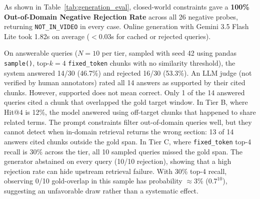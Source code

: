 \documentclass[conference]{IEEEtran}
\begin{document}
\begin{table}[htbp]
\caption{End-to-End Generation Evaluation Across Pedagogical Tiers ($N_{\text{pos}}=30, N_{\text{neg}}=26$, Evaluated under \texttt{fixed\_token}, Top-$k=4$)}
\label{tab:generation_eval}
\centering
{}
\end{table}

As shown in Table~\ref{tab:generation_eval}, closed-world constraints gave a \textbf{100\% Out-of-Domain Negative Rejection Rate} across all 26 negative probes, returning \texttt{NOT\_IN\_VIDEO} in every case. Online generation with Gemini 3.5 Flash Lite took 1.82s on average ($<$0.03s for cached or rejected queries). 

On answerable queries ($N=10$ per tier, sampled with seed 42 using pandas \texttt{sample()}, top-$k=4$ \texttt{fixed\_token} chunks with no similarity threshold), the system answered 14/30 (46.7\%) and rejected 16/30 (53.3\%). An LLM judge (not verified by human annotators) rated all 14 answers as supported by their cited chunks. However, supported does not mean correct. Only 1 of the 14 answered queries cited a chunk that overlapped the gold target window. In Tier B, where Hit@4 is 12\%, the model answered using off-target chunks that happened to share related terms. The prompt constraints filter out-of-domain queries well, but they cannot detect when in-domain retrieval returns the wrong section: 13 of 14 answers cited chunks outside the gold span. In Tier C, where \texttt{fixed\_token} top-4 recall is 30\% across the tier, all 10 sampled queries missed the gold span. The generator abstained on every query (10/10 rejection), showing that a high rejection rate can hide upstream retrieval failure. With 30\% top-4 recall, observing 0/10 gold-overlap in this sample has probability $\approx$3\% ($0.7^{10}$), suggesting an unfavorable draw rather than a systematic effect.
\end{document}
